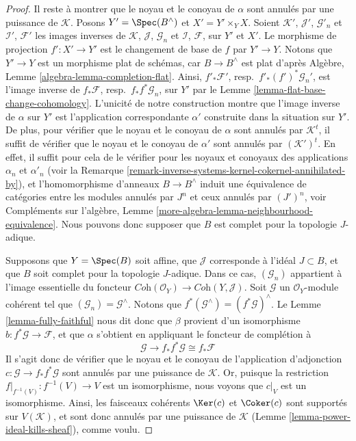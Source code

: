 \begin{proof}
\medskip\noindent
Il reste à montrer que le noyau et le conoyau de $\alpha$ sont
annulés par une puissance de $\mathcal{K}$. Posons $Y' = \Spec(B^\wedge)$
et $X' = Y' \times_Y X$. Soient $\mathcal{K}'$, $\mathcal{J}'$,
$\mathcal{G}'_n$ et $\mathcal{I}'$, $\mathcal{F}'$ les images inverses de
$\mathcal{K}$, $\mathcal{J}$, $\mathcal{G}_n$ et
$\mathcal{I}$, $\mathcal{F}$, sur $Y'$ et $X'$.
Le morphisme de projection $f' : X' \to Y'$ est le changement de base de
$f$ par $Y' \to Y$. Notons que $Y' \to Y$ est un morphisme plat de schémas,
car $B \to B^\wedge$ est plat d'après
Algèbre, Lemme \ref{algebra-lemma-completion-flat}.
Ainsi, $f'_*\mathcal{F}'$, resp.\ $f'_*(f')^*\mathcal{G}_n'$,
est l'image inverse de $f_*\mathcal{F}$, resp.\ $f_*f^*\mathcal{G}_n$,
sur $Y'$ par le Lemme \ref{lemma-flat-base-change-cohomology}.
L'unicité de notre construction montre que l'image inverse de $\alpha$ sur
$Y'$ est l'application correspondante $\alpha'$ construite dans la situation
sur $Y'$. De plus, pour vérifier que le noyau et le conoyau de $\alpha$ sont
annulés par $\mathcal{K}^t$, il suffit de vérifier que le noyau et le conoyau
de $\alpha'$ sont annulés par $(\mathcal{K}')^t$. En effet, il suffit pour
cela de le vérifier pour les noyaux et conoyaux des applications $\alpha_n$
et $\alpha'_n$
(voir la Remarque \ref{remark-inverse-systems-kernel-cokernel-annihilated-by}),
et l'homomorphisme d'anneaux $B \to B^\wedge$ induit une équivalence de
catégories entre les modules annulés par $J^n$ et ceux annulés par $(J')^n$,
voir Compléments sur l'algèbre, Lemme
\ref{more-algebra-lemma-neighbourhood-equivalence}.
Nous pouvons donc supposer que $B$ est complet pour la topologie $J$-adique.

\medskip\noindent
Supposons que $Y = \Spec(B)$ soit affine, que $\mathcal{J}$ corresponde à
l'idéal $J \subset B$, et que $B$ soit complet pour la topologie $J$-adique.
Dans ce cas, $(\mathcal{G}_n)$ appartient à l'image essentielle du foncteur
$\textit{Coh}(\mathcal{O}_Y) \to \textit{Coh}(Y, \mathcal{J})$.
Soit $\mathcal{G}$ un $\mathcal{O}_Y$-module cohérent tel que
$(\mathcal{G}_n) = \mathcal{G}^\wedge$. Notons que
$f^*(\mathcal{G}^\wedge) = (f^*\mathcal{G})^\wedge$. Le
Lemme \ref{lemma-fully-faithful}
nous dit donc que $\beta$ provient d'un isomorphisme
$b : f^*\mathcal{G} \to \mathcal{F}$,
et que $\alpha$ s'obtient en appliquant le foncteur de complétion à
$$
\mathcal{G} \to f_*f^*\mathcal{G} \cong f_*\mathcal{F}
$$
Il s'agit donc de vérifier que le noyau et le conoyau de l'application
d'adjonction $c : \mathcal{G} \to f_*f^*\mathcal{G}$ sont annulés par
une puissance de $\mathcal{K}$. Or, puisque la restriction
$f|_{f^{-1}(V)} : f^{-1}(V) \to V$ est un isomorphisme,
nous voyons que $c|_V$ est un isomorphisme. Ainsi, les faisceaux cohérents
$\Ker(c)$ et $\Coker(c)$ sont supportés sur $V(\mathcal{K})$,
et sont donc annulés par une puissance de $\mathcal{K}$
(Lemme \ref{lemma-power-ideal-kills-sheaf}), comme voulu.
\end{proof}

